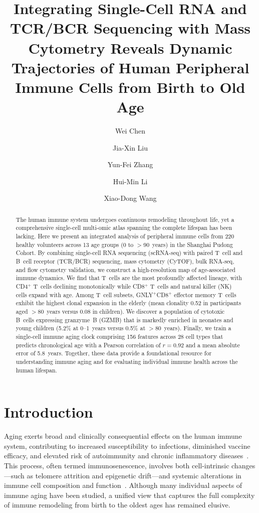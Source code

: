 \documentclass[11pt]{article}
\title{Integrating Single-Cell RNA and TCR/BCR Sequencing with Mass Cytometry Reveals Dynamic Trajectories of Human Peripheral Immune Cells from Birth to Old Age}
\author[1]{Wei Chen}
\author[1]{Jia-Xin Liu}
\author[1]{Yun-Fei Zhang}
\author[2]{Hui-Min Li}
\author[1,2,*]{Xiao-Dong Wang}
\affil[1]{Shanghai Institute of Immunology, Shanghai Jiao Tong University School of Medicine, Shanghai, China}
\affil[2]{Department of Immunology, Pudong New Area People's Hospital, Shanghai, China}
\affil[*]{Corresponding author: xdwang@immunology.edu.cn}
\date{}
\begin{document}
\maketitle

\begin{abstract}
The human immune system undergoes continuous remodeling throughout life, yet a comprehensive single-cell multi-omic atlas spanning the complete lifespan has been lacking. Here we present an integrated analysis of peripheral immune cells from 220 healthy volunteers across 13 age groups (0 to $>$90~years) in the Shanghai Pudong Cohort. By combining single-cell RNA sequencing (scRNA-seq) with paired T~cell and B~cell receptor (TCR/BCR) sequencing, mass cytometry (CyTOF), bulk RNA-seq, and flow cytometry validation, we construct a high-resolution map of age-associated immune dynamics. We find that T~cells are the most profoundly affected lineage, with CD4$^+$ T~cells declining monotonically while CD8$^+$ T~cells and natural killer (NK) cells expand with age. Among T~cell subsets, GNLY$^+$CD8$^+$ effector memory T~cells exhibit the highest clonal expansion in the elderly (mean clonality 0.52 in participants aged $>$80~years versus 0.08 in children). We discover a population of cytotoxic B~cells expressing granzyme~B (GZMB) that is markedly enriched in neonates and young children (5.2\% at 0--1~years versus 0.5\% at $>$80~years). Finally, we train a single-cell immune aging clock comprising 156 features across 28 cell types that predicts chronological age with a Pearson correlation of $r=0.92$ and a mean absolute error of 5.8~years. Together, these data provide a foundational resource for understanding immune aging and for evaluating individual immune health across the human lifespan.
\end{abstract}

\section{Introduction}

Aging exerts broad and clinically consequential effects on the human immune system, contributing to increased susceptibility to infections, diminished vaccine efficacy, and elevated risk of autoimmunity and chronic inflammatory diseases~\citep{franceschi2000inflammaging,goronzy2013understanding}. This process, often termed immunosenescence, involves both cell-intrinsic changes---such as telomere attrition and epigenetic drift---and systemic alterations in immune cell composition and function~\citep{nikolich2014aging}. Although many individual aspects of immune aging have been studied, a unified view that captures the full complexity of immune remodeling from birth to the oldest ages has remained elusive.
\end{document}
